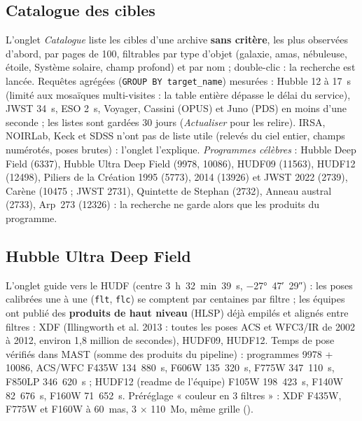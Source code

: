 \subsection{Catalogue des cibles}
L'onglet \emph{Catalogue} liste les cibles d'une archive \textbf{sans critère}, les plus observées d'abord, par pages
de 100, filtrables par type d'objet (galaxie, amas, nébuleuse, étoile, Système solaire, champ profond) et par nom ;
double-clic : la recherche est lancée. Requêtes agrégées (\texttt{GROUP BY target\_name}) mesurées : Hubble 12 à
17~s (limité aux mosaïques multi-visites : la table entière dépasse le délai du service), JWST 34~s, ESO 2~s,
Voyager, Cassini (OPUS) et Juno (PDS) en moins d'une seconde ; les listes sont gardées 30 jours (\emph{Actualiser}
pour les relire). IRSA, NOIRLab, Keck et SDSS n'ont pas de liste utile (relevés du ciel entier, champs numérotés,
poses brutes) : l'onglet l'explique. \emph{Programmes célèbres} : Hubble Deep Field (6337), Hubble Ultra Deep Field
(9978, 10086), HUDF09 (11563), HUDF12 (12498), Piliers de la Création 1995 (5773), 2014 (13926) et JWST 2022 (2739),
Carène (10475 ; JWST 2731), Quintette de Stephan (2732), Anneau austral (2733), Arp~273 (12326) : la recherche ne
garde alors que les produits du programme.

\subsection{Hubble Ultra Deep Field}
L'onglet guide vers le HUDF (centre 3~h~32~min~39~s, −27°~47′~29″) : les poses calibrées une à une (\texttt{flt},
\texttt{flc}) se comptent par centaines par filtre ; les équipes ont publié des \textbf{produits de haut niveau}
(HLSP) déjà empilés et alignés entre filtres : XDF (Illingworth et al. 2013 : toutes les poses ACS et WFC3/IR de 2002
à 2012, environ 1,8 million de secondes), HUDF09, HUDF12. Temps de pose vérifiés dans MAST (somme des produits du
pipeline) : programmes 9978 + 10086, ACS/WFC F435W 134~880~s, F606W 135~320~s, F775W 347~110~s, F850LP 346~620~s ;
HUDF12 (readme de l'équipe) F105W 198~423~s, F140W 82~676~s, F160W 71~652~s. Préréglage « couleur en 3 filtres » :
XDF F435W, F775W et F160W à 60~mas, 3 × 110~Mo, même grille ().

